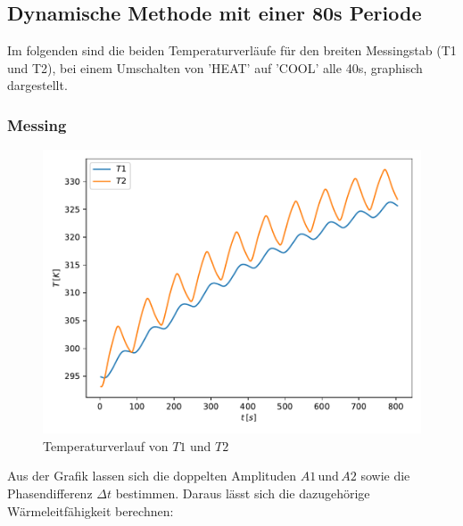     \subsection{Dynamische Methode mit einer 80s Periode}

    Im folgenden sind die beiden Temperaturverläufe für den breiten Messingstab (T1 und T2), bei einem Umschalten von 'HEAT' auf 'COOL' alle 40s, graphisch dargestellt.

    \subsubsection{Messing}

    \begin{figure}
    \centering
    \includegraphics[width=\textwidth]{Daten/grafic3.pdf}
    \caption{Temperaturverlauf von $T1$ und $T2$}
    \label{fig:dyn_T1}
    \end{figure}
    \noindent
    Aus der Grafik lassen sich die doppelten Amplituden $A1 \, \text{und} \, A2$ sowie die Phasendifferenz $\Delta t$ bestimmen. Daraus lässt sich die dazugehörige Wärmeleitfähigkeit berechnen:
